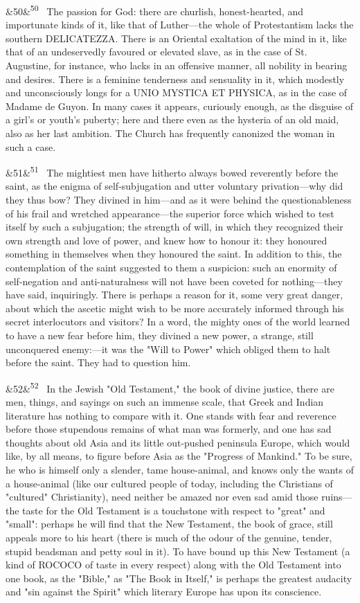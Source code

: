 \documentclass[12pt]{article}
\newcommand{\para}[1][]{\par\noindent\ifx&#1&\else\textsuperscript{\footnotesize #1}~\fi}
\begin{document}
\para[50] The passion for God: there are churlish, honest-hearted, and importunate kinds of it, like that of Luther---the whole of Protestantism lacks the southern DELICATEZZA. There is an Oriental exaltation of the mind in it, like that of an undeservedly favoured or elevated slave, as in the case of St. Augustine, for instance, who lacks in an offensive manner, all nobility in bearing and desires. There is a feminine tenderness and sensuality in it, which modestly and unconsciously longs for a UNIO MYSTICA ET PHYSICA, as in the case of Madame de Guyon. In many cases it appears, curiously enough, as the disguise of a girl's or youth's puberty; here and there even as the hysteria of an old maid, also as her last ambition. The Church has frequently canonized the woman in such a case.

\para[51] The mightiest men have hitherto always bowed reverently before the saint, as the enigma of self-subjugation and utter voluntary privation---why did they thus bow? They divined in him---and as it were behind the questionableness of his frail and wretched appearance---the superior force which wished to test itself by such a subjugation; the strength of will, in which they recognized their own strength and love of power, and knew how to honour it: they honoured something in themselves when they honoured the saint. In addition to this, the contemplation of the saint suggested to them a suspicion: such an enormity of self-negation and anti-naturalness will not have been coveted for nothing---they have said, inquiringly. There is perhaps a reason for it, some very great danger, about which the ascetic might wish to be more accurately informed through his secret interlocutors and visitors? In a word, the mighty ones of the world learned to have a new fear before him, they divined a new power, a strange, still unconquered enemy:---it was the "Will to Power" which obliged them to halt before the saint. They had to question him.

\para[52] In the Jewish "Old Testament," the book of divine justice, there are men, things, and sayings on such an immense scale, that Greek and Indian literature has nothing to compare with it. One stands with fear and reverence before those stupendous remains of what man was formerly, and one has sad thoughts about old Asia and its little out-pushed peninsula Europe, which would like, by all means, to figure before Asia as the "Progress of Mankind." To be sure, he who is himself only a slender, tame house-animal, and knows only the wants of a house-animal (like our cultured people of today, including the Christians of "cultured" Christianity), need neither be amazed nor even sad amid those ruins---the taste for the Old Testament is a touchstone with respect to "great" and "small": perhaps he will find that the New Testament, the book of grace, still appeals more to his heart (there is much of the odour of the genuine, tender, stupid beadsman and petty soul in it). To have bound up this New Testament (a kind of ROCOCO of taste in every respect) along with the Old Testament into one book, as the "Bible," as "The Book in Itself," is perhaps the greatest audacity and "sin against the Spirit" which literary Europe has upon its conscience.
\end{document}
